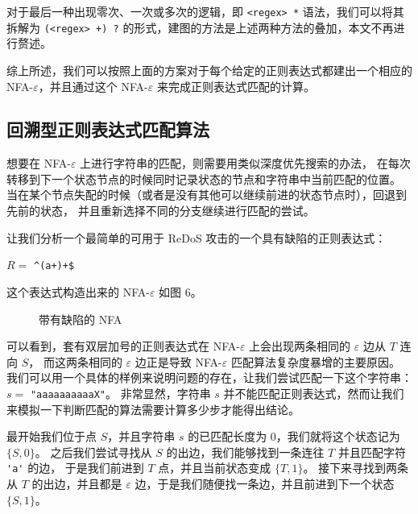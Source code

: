 \documentclass[hyperref,UTF8,12pt,a4paper]{ctexart}
\begin{document}
对于最后一种出现零次、一次或多次的逻辑，即 \verb|<regex> *| 语法，我们可以将其拆解为 \verb|(<regex> +) ?| 的形式，建图的方法是上述两种方法的叠加，本文不再进行赘述。

综上所述，我们可以按照上面的方案对于每个给定的正则表达式都建出一个相应的 NFA-$\varepsilon$，并且通过这个 NFA-$\varepsilon$ 来完成正则表达式匹配的计算。

\subsection{回溯型正则表达式匹配算法}

想要在 NFA-$\varepsilon$ 上进行字符串的匹配，则需要用类似深度优先搜索的办法，
在每次转移到下一个状态节点的时候同时记录状态的节点和字符串中当前匹配的位置。
当在某个节点失配的时候（或者是没有其他可以继续前进的状态节点时），回退到先前的状态，
并且重新选择不同的分支继续进行匹配的尝试。

让我们分析一个最简单的可用于 ReDoS 攻击的一个具有缺陷的正则表达式：

$R=$ \verb|^(a+)+$|

这个表达式构造出来的 NFA-$\varepsilon$ 如图 6。

\begin{figure}[h]
	\centering
	\caption{带有缺陷的 NFA}
\end{figure}

可以看到，套有双层加号的正则表达式在 NFA-$\varepsilon$ 上会出现两条相同的 $\varepsilon$ 边从 $T$ 连向 $S$，
而这两条相同的 $\varepsilon$ 边正是导致 NFA-$\varepsilon$ 匹配算法复杂度暴增的主要原因。
我们可以用一个具体的样例来说明问题的存在，让我们尝试匹配一下这个字符串：$s=$ \verb|"aaaaaaaaaaX"|。
非常显然，字符串 $s$ 并不能匹配正则表达式，然而让我们来模拟一下判断匹配的算法需要计算多少步才能得出结论。

最开始我们位于点 $S$，并且字符串 $s$ 的已匹配长度为 $0$，我们就将这个状态记为 $\{S, 0\}$。
之后我们尝试寻找从 $S$ 的出边，我们能够找到一条连往 $T$ 并且匹配字符 \verb|'a'| 的边，
于是我们前进到 $T$ 点，并且当前状态变成 $\{T, 1\}$。
接下来寻找到两条从 $T$ 的出边，并且都是 $\varepsilon$ 边，于是我们随便找一条边，并且前进到下一个状态 $\{S, 1\}$。
\end{document}
